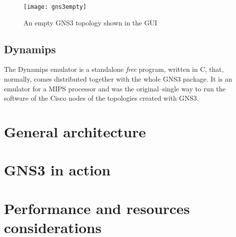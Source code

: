 \begin{figure}
  \centering
  \texttt{[image: gns3empty]}
  \caption{An empty GNS3 topology shown in the GUI}
\end{figure}

\subsection{Dynamips}
\label{subsec:gns3dynamips}

The Dynamips emulator is a standalone \emph{free} program, written in C, that, normally, comes distributed together with the whole GNS3 package.
It is an emulator for a MIPS processor and was the original--single way to run the software of the Cisco nodes of the topologies created with GNS3.


\section{General architecture}
\label{sec:gns3architecture}


\section{GNS3 in action}
\label{sec:gns3inaction}


\section{Performance and resources considerations}
\label{sec:gns3performance}


